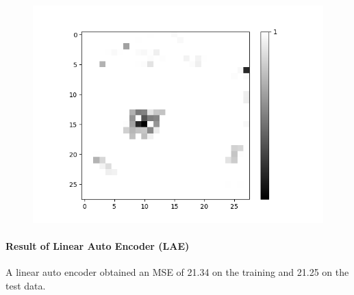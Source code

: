 \begin{figure}[H]
\begin{minipage}[b]{0.19\textwidth}
		\includegraphics[width=\textwidth]{LoAE(AND)(20LF)/False/Feature-17.png}
		\label{}
	\end{minipage}
	
	\hfill
\end{figure}

\paragraph{Result of Linear Auto Encoder (LAE)}
A linear auto encoder obtained an MSE of 21.34 on the training and 21.25 on the test data.

